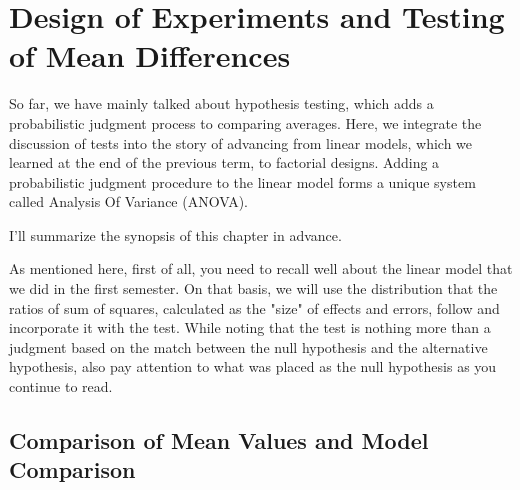 \documentclass{ltjbook}
\begin{document}
\chapter{Design of Experiments and Testing of Mean Differences}
\label{m21_anova}
So far, we have mainly talked about hypothesis testing, which adds a probabilistic judgment process to comparing averages.
Here, we integrate the discussion of tests into the story of advancing from linear models, which we learned at the end of the previous term, to factorial designs. Adding a probabilistic judgment procedure to the linear model forms a unique system called Analysis Of Variance (ANOVA).

I'll summarize the synopsis of this chapter in advance.


As mentioned here, first of all, you need to recall well about the linear model that we did in the first semester. On that basis, we will use the distribution that the ratios of sum of squares, calculated as the "size" of effects and errors, follow and incorporate it with the test. While noting that the test is nothing more than a judgment based on the match between the null hypothesis and the alternative hypothesis, also pay attention to what was placed as the null hypothesis as you continue to read.

\section{Comparison of Mean Values and Model Comparison}
\end{document}
